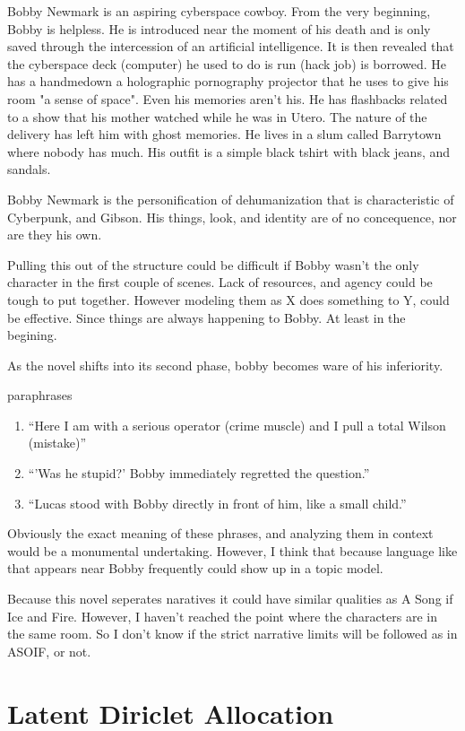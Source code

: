 \documentclass{report}\usepackage[]{graphicx}\usepackage[]{color}
\begin{document}
{Bobby Newmark is an aspiring cyberspace cowboy. From the very beginning, Bobby is helpless. He is introduced near the moment of his death and is only saved through the intercession of an artificial intelligence. It is then revealed that the cyberspace deck (computer) he used to do is run (hack job) is borrowed. He has a handmedown a holographic pornography projector that he uses to give his room "a sense of space". Even his memories aren't his. He has flashbacks related to a show that his mother watched while he was in Utero. The nature of the delivery has left him with ghost memories. He lives in a slum called Barrytown where nobody has much. His outfit is a simple black tshirt with black jeans, and sandals.

Bobby Newmark is the personification of dehumanization that is characteristic of Cyberpunk, and Gibson. His things, look, and identity are of no concequence, nor are they his own.

Pulling this out of the structure could be difficult if Bobby wasn't the only character in the first couple of scenes. Lack of resources, and agency could be tough to put together. However modeling them as X does something to Y, could be effective. Since things are always happening to Bobby. At least in the begining. 

\date{February 5, 2014}
As the novel shifts into its second phase, bobby becomes ware of his inferiority.

paraphrases
\begin{enumerate}
\item
  ``Here I am with a serious operator (crime muscle) and I pull a total Wilson (mistake)''
\item
  ``'Was he stupid?' Bobby immediately regretted the question.''
\item
  ``Lucas stood with Bobby directly in front of him, like a small child.''
\end{enumerate}

Obviously the exact meaning of these phrases, and analyzing them in context would be a monumental undertaking. However, I think that because language like that appears near Bobby frequently could show up in a topic model. 

Because this novel seperates naratives it could have similar qualities as A Song if Ice and Fire. However, I haven't reached the point where the characters are in the same room. So I don't know if the strict narrative limits will be followed as in ASOIF, or not.

\section{Latent Diriclet Allocation}
\date{February 5, 2014}

}
\end{document}
